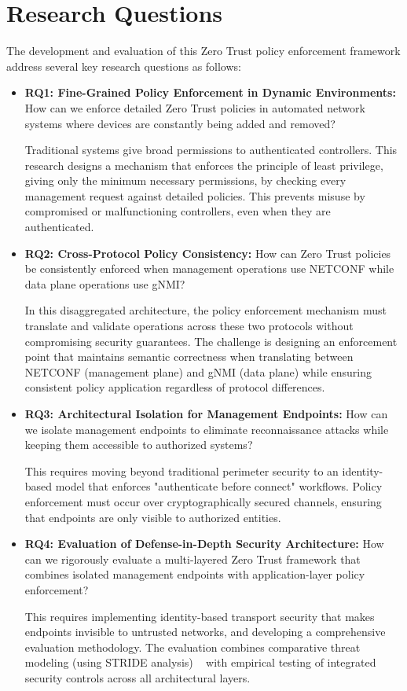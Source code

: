 \documentclass[12pt, a4paper, reqno, oneside]{book}
\newcommand \sect[1]{%
  \section*{#1}%
  \addcontentsline{toc}{section}{#1}}
\begin{document}
\sect{Research Questions}

\label{sec:research_challenges}
The development and evaluation of this Zero Trust policy enforcement framework address several key research questions as follows:

\begin{itemize}
    \item \textbf{RQ1: Fine-Grained Policy Enforcement in Dynamic Environments:} How can we enforce detailed Zero Trust policies in automated network systems where devices are constantly being added and removed?
    
    Traditional systems give broad permissions to authenticated controllers. This research designs a mechanism that enforces the principle of least privilege, giving only the minimum necessary permissions, by checking every management request against detailed policies. This prevents misuse by compromised or malfunctioning controllers, even when they are authenticated.
    
    \item \textbf{RQ2: Cross-Protocol Policy Consistency:} How can Zero Trust policies be consistently enforced when management operations use NETCONF while data plane operations use gNMI? 
    
    In this disaggregated architecture, the policy enforcement mechanism must translate and validate operations across these two protocols without compromising security guarantees. The challenge is designing an enforcement point that maintains semantic correctness when translating between NETCONF (management plane) and gNMI (data plane) while ensuring consistent policy application regardless of protocol differences.
    \item \textbf{RQ3: Architectural Isolation for Management Endpoints:} How can we isolate management endpoints to eliminate reconnaissance attacks while keeping them accessible to authorized systems? 
    
    This requires moving beyond traditional perimeter security to an identity-based model that enforces "authenticate before connect" workflows. Policy enforcement must occur over cryptographically secured channels, ensuring that endpoints are only visible to authorized entities.
    
    \item \textbf{RQ4: Evaluation of Defense-in-Depth Security Architecture:} How can we rigorously evaluate a multi-layered Zero Trust framework that combines isolated management endpoints with application-layer policy enforcement? 
    
    This requires implementing identity-based transport security that makes endpoints invisible to untrusted networks, and developing a comprehensive evaluation methodology. The evaluation combines comparative threat modeling (using STRIDE analysis) ~\cite{Khan2017stride, ruffy2016stride}  with empirical testing of integrated security controls across all architectural layers.
\end{itemize}
\end{document}

